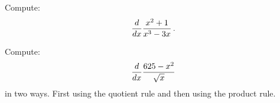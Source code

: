 \documentclass[10pt,t,presentation,ignorenonframetext,aspectratio=169]{beamer}
\begin{document}
\begin{frame}
  \vs
  \question{} Compute:
  \[
    \frac{d}{\mathop{}\!d x} \frac{x^2+1}{x^3-3x} \,.
  \]
\end{frame}

\begin{frame}
  \vs
  \question{} Compute:
  \[
    \frac{d}{\mathop{}\!d x} \frac{625-x^2}{\sqrt{x}}
  \]
  in two ways. First using the quotient rule and then using the product
  rule.
\end{frame}
\end{document}
